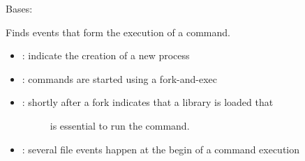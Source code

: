 \documentclass[letterpaper,10pt,english]{sphinxmanual}
\begin{document}

\begin{fulllineitems}
\label{ambrosia_plugins.lkm:ambrosia_plugins.lkm.CommandExecuteCorrelator}
Bases: {\hyperref[ambrosia:ambrosia.Correlator]{}}

Finds events that form the execution of a command.
\begin{itemize}
\item {} 
{\hyperref[ambrosia_plugins.lkm:ambrosia_plugins.lkm.events.StartTaskEvent]{}}: indicate the creation of a new process

\item {} 
{\hyperref[ambrosia_plugins.lkm:ambrosia_plugins.lkm.events.ExecEvent]{}}: commands are started using a fork-and-exec

\item {} \begin{description}
\item[{: shortly after a fork indicates that a library is loaded that}] \leavevmode
is essential to run the command.

\end{description}

\item {} 
{\hyperref[ambrosia_plugins.lkm:ambrosia_plugins.lkm.events.FileEvent]{}}: several file events happen at the begin of a command execution

\end{itemize}

\begin{fulllineitems}
\label{ambrosia_plugins.lkm:ambrosia_plugins.lkm.CommandExecuteCorrelator._find_file_events}
\end{fulllineitems}


\begin{fulllineitems}
\label{ambrosia_plugins.lkm:ambrosia_plugins.lkm.CommandExecuteCorrelator._find_java_library_loads}
\end{fulllineitems}


\end{fulllineitems}
\end{document}
